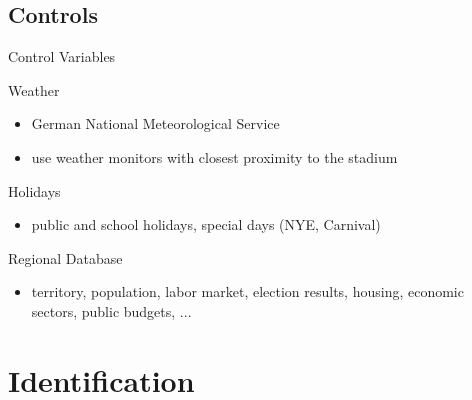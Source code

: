 \documentclass[usenames,dvipsnames]{beamer} %
\begin{document}
	\subsection{Controls}
	\begin{frame}{Control Variables}\label{link_weather_data}
		\begin{block}{Weather}
			\begin{itemize}
				\item German National Meteorological Service
				\item use weather monitors with closest proximity to the stadium \newline \hyperlink{link_map_stadiums}{} \hyperlink{link_hist_dist_monitor_stadiums}{}
			\end{itemize}
		\end{block}
		\begin{block}{Holidays}
			\begin{itemize}
				\item public and school holidays, special days (NYE, Carnival)
			\end{itemize}	
		\end{block}
		\begin{block}{Regional Database}
			\begin{itemize}
				\item territory, population, labor market, election results, housing, economic sectors, public budgets, ... 
			\end{itemize}
		\end{block}
	\end{frame}


\section{Identification}
\end{document}
